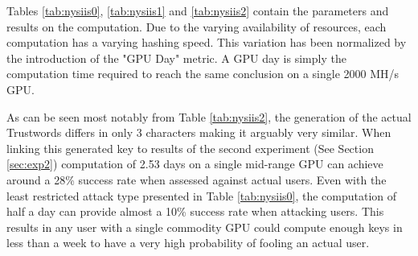 Tables \ref{tab:nysiis0}, \ref{tab:nysiis1} and \ref{tab:nysiis2} contain the parameters and results on the computation. Due to the varying availability of resources, each computation has a varying hashing speed. This variation has been normalized by the introduction of the "GPU Day" metric. A GPU day is simply the computation time required to reach the same conclusion on a single 2000 MH/s GPU. 

As can be seen most notably from Table \ref{tab:nysiis2}, the generation of the actual Trustwords differs in only 3 characters making it arguably very similar. When linking this generated key to results of the second experiment (See Section \ref{sec:exp2}) computation of 2.53 days on a single mid-range GPU can achieve around a 28\% success rate when assessed against actual users. Even with the least restricted attack type presented in Table \ref{tab:nysiis0}, the computation of half a day can provide almost a 10\% success rate when attacking users. This results in any user with a single commodity GPU could compute enough keys in less than a week to have a very high probability of fooling an actual user.
